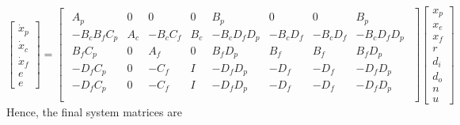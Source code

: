 \documentclass[a4paper,12pt]{article}
\begin{document}
			\[
				\begin{bmatrix}
				\dot{x}_{p} \\
				\dot{x}_{c} \\
				\dot{x}_{f} \\				
				\hline
				e \\
				\hline
				e
				\end{bmatrix}
				=
				\begin{bmatrix}
				\begin{array}{ccc|cccc|c}
				A_{p} & 0 & 0 & 0 & B_{p} & 0 & 0 & B_{p}\\
				-B_{c}B_{f}C_{p} & A_{c} & -B_{c}C_{f} & B_{c} & -B_{c}D_{f}D_{p} & -B_{c}D_{f} & -B_{c}D_{f} & -B_{c}D_{f}D_{p}\\
				B_{f}C_{p} & 0 & A_{f} & 0 & B_{f}D_{p} & B_{f} & B_{f} & B_{f}D_{p} \\
				\hline
				-D_{f}C_{p} & 0 & -C_{f} & I & -D_{f}D_{p} & -D_{f} & -D_{f} & -D_{f}D_{p} \\
				\hline
				-D_{f}C_{p} & 0 & -C_{f} & I & -D_{f}D_{p} & -D_{f} & -D_{f} & -D_{f}D_{p} \\
				\end{array}
				\end{bmatrix}
				\begin{bmatrix}
				x_{p} \\ x_{e} \\ x_{f} \\ \hline r \\ d_{i} \\ d_{o} \\ n \\ \hline u 
				\end{bmatrix}	
				\]
				Hence, the final system matrices are
				
\end{document}
